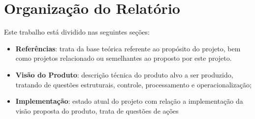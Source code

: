 \section{Organização do Relatório}
Este trabalho está dividido nas seguintes seções:
\begin{itemize}
	\item \textbf{Referências}: trata da base teórica referente ao propósito do projeto, bem como projetos relacionado
	ou semelhantes ao proposto por este projeto.
	\item \textbf{Visão do Produto}: descrição técnica do produto alvo a ser produzido, tratando de questões estruturais,
	controle, processamento e operacionalização;
	\item \textbf{Implementação}: estado atual do projeto com relação a implementação da visão proposta do produto,
	trata de questões de ações
\end{itemize}
